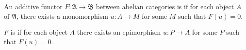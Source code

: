 An additive functor $F: \mathfrak{A} \to \mathfrak{B}$ between abelian categories is  if for each object $A$ of $\mathfrak{A}$, there exists a monomorphism $u: A \to M$ for some $M$ such that $F(u) = 0$.

$F$ is  if for each object $A$ there exists an epimorphism $u: P \to A$ for some $P$ such that $F(u) = 0$.
